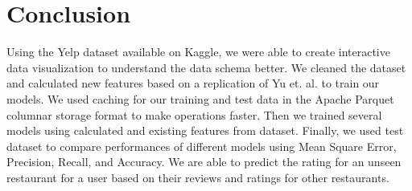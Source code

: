 \documentclass[12pt]{article}
\begin{document}
\section{Conclusion}

Using the Yelp dataset available on Kaggle, we were able to create interactive data
visualization to understand the data schema better. We cleaned the dataset and calculated
new features based on a replication of Yu et. al. \cite{yu2015restaurants} to train our
models. We used caching for our training and test data in the Apache Parquet columnar storage
format to make operations faster. Then we trained several models using calculated and existing
features from dataset. Finally, we used test dataset to compare performances of different
models using Mean Square Error, Precision, Recall, and Accuracy. We are able to predict the
rating for an unseen restaurant for a user based on their reviews and ratings for other
restaurants.


 

\end{document}
